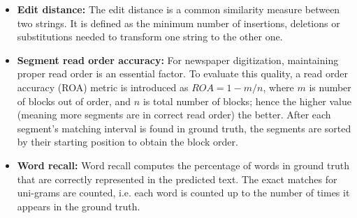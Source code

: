 \documentclass[letterpaper]{article} %
\begin{document}
\begin{itemize}
    \item \textbf{Edit distance:} The edit distance is a common similarity measure between two strings. It is defined as the minimum number of insertions, deletions or substitutions needed to transform one string to the other one.
    \item \textbf{Segment read order accuracy:} For newspaper digitization, maintaining proper read order is an essential factor. To evaluate this quality, a read order accuracy (ROA) metric is introduced as $ROA = 1 - m / n$, where $m$ is number of blocks out of order, and $n$ is total number of blocks; hence the higher value (meaning more segments are in correct read order) the better. After each segment's matching interval is found in ground truth, the segments are sorted by their starting position to obtain the block order.
    \item \textbf{Word recall:} Word recall computes the percentage of words in ground truth that are correctly represented in the predicted text. The exact matches for uni-grams are counted, i.e.  each word is counted up to the number of times it appears in the ground truth. 
\end{itemize}
\end{document}
